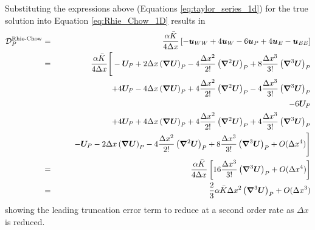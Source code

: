 \documentclass[sn-mathphys,Numbered]{sn-jnl}%
\newcommand{\bb}{\boldsymbol}
\begin{document}
\begin{appendices}
Substituting the expressions above (Equations \ref{eq:taylor_series_1d}) for the true solution into Equation \ref{eq:Rhie_Chow_1D} results in
\begin{eqnarray}
	\mathcal{D}_P^{\text {Rhie-Chow}}
	&=& 	\frac{\alpha \bar{K}}{4 \Delta x}	\left[- \bb{u}_{WW} + 4\bb{u}_W - 6\bb{u}_P + 4\bb{u}_{E} - \bb{u}_{EE} \right] \notag \\
	&=& 	\frac{\alpha \bar{K}}{4 \Delta x}
	\Bigg[
	- \bb{U}_P + 2\Delta x \left( \bb{\nabla} \bb{U} \right)_P - 4\frac{\Delta x^2}{2!} \left( \bb{\nabla}^2 \bb{U} \right)_P 
		+ 8\frac{\Delta x^3}{3!} \left( \bb{\nabla}^3 \bb{U} \right)_P \notag \\
	&&\quad\quad + 4\bb{U}_P - 4\Delta x \left( \bb{\nabla} \bb{U} \right)_P + 4\frac{\Delta x^2}{2!} \left( \bb{\nabla}^2 \bb{U} \right)_P
		- 4\frac{\Delta x^3}{3!} \left( \bb{\nabla}^3 \bb{U} \right)_P \notag \\
	&&\quad\quad - 6\bb{U}_P \notag \\
	&&\quad\quad + 4\bb{U}_P + 4\Delta x \left( \bb{\nabla} \bb{U} \right)_P + 4\frac{\Delta x^2}{2!} \left( \bb{\nabla}^2 \bb{U} \right)_P
		+ 4 \frac{\Delta x^3}{3!} \left( \bb{\nabla}^3 \bb{U} \right)_P \notag \\
	&&\quad\quad - \bb{U}_P - 2\Delta x \left( \bb{\nabla} \bb{U} \right)_P - 4\frac{\Delta x^2}{2!} \left( \bb{\nabla}^2 \bb{U} \right)_P 
		+ 8\frac{\Delta x^3}{3!} \left( \bb{\nabla}^3 \bb{U} \right)_P + O(\Delta x^4) \Bigg] \notag \\
	&=& 	\frac{\alpha \bar{K}}{4 \Delta x}	\left[ 16\frac{\Delta x^3}{3!} \left( \bb{\nabla}^3 \bb{U} \right)_P  + O(\Delta x^4) \right] \notag \\
	&=& 	\frac{2}{3} \alpha \bar{K}  \Delta x^2 \left( \bb{\nabla}^3 \bb{U} \right)_P  + O(\Delta x^3)
\end{eqnarray}
showing the leading truncation error term to reduce at a second order rate as $\Delta x$ is reduced.



\end{appendices}
\end{document}
